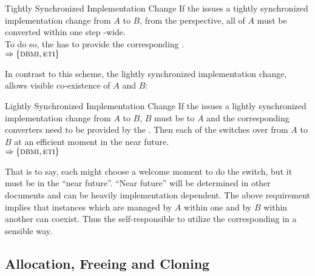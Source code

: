 \documentclass[a4paper, 12pt]{book}
\newcommand{\INTERFACE}[1]{$\Rightarrow\left\{#1\right\}$}
\begin{document}
\begin{requirement*}{Tightly Synchronized Implementation Change}
  If the  issues a tightly synchronized implementation change from
   $A$ to $B$, from the 
  perspective, all  of $A$ must be converted within
  one step -wide.\\
  To do so, the  has to provide the corresponding .\\
  \INTERFACE{\DBMI,\ETI}
\end{requirement*}
%
In contrast to this scheme, the lightly synchronized implementation change,
allows  visible co-existence of $A$ and $B$:
\begin{requirement*}{Lightly Synchronized Implementation Change}
  If the  issues a lightly synchronized implementation change from
   $A$ to $B$, $B$ must be  to $A$ and the corresponding converters need to be provided by
  the . Then each  of the  switches over from $A$ to $B$ at an efficient moment in the
  near future.\\ 
  \INTERFACE{\DBMI,\ETI}
\end{requirement*}
%
That is to say, each  might choose a welcome
moment to do the switch, but it must be in the ``near future''. ``Near
future'' will be determined in other documents and can be heavily
implementation dependent. The above requirement implies that instances
which are managed by $A$ within one  and by $B$ within
another  can coexist. Thus the 
self-responsible to utilize the corresponding  in a
sensible way.



\subsection{Allocation, Freeing and Cloning}
\end{document}
